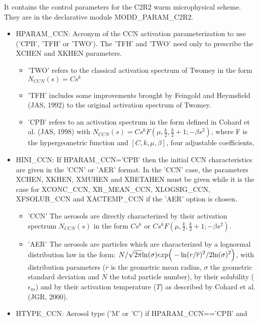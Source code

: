 It contains the control parameters for the C2R2 warm microphysical
scheme. They are in the declarative module MODD\_PARAM\_C2R2.
\begin{itemize}
\item HPARAM\_CCN: Acronym of the CCN activation parameterization to use ('CPB',
'TFH' or 'TWO'). The 'TFH' and 'TWO' need only to prescribe the XCHEN and XKHEN
 parameters.
\begin{itemize}
\item 'TWO' refers to the classical activation spectrum of Twomey
in the form $N_{CCN}(s)= C s^k$
\item 'TFH' includes some improvements brought by Feingold and Heymsfield
(JAS, 1992) to the original activation spectrum of Twomey.
\item 'CPB' refers to an activation spectrum in the form defined in Cohard et 
al. (JAS, 1998) with 
$N_{CCN}(s)= C s^k F(\mu,\frac{\displaystyle{k}}{\displaystyle{2}},
                  \frac{\displaystyle{k}}{\displaystyle{2}}+1;-\beta s^2)$,
where F is the hypergeometric function and $[C, k, \mu, \beta]$, four adjustable
 coefficients,
\end{itemize}
\item HINI\_CCN: If HPARAM\_CCN='CPB' then the initial CCN characteristics are
given in the 'CCN' or 'AER' format. In the 'CCN' case, the parameters XCHEN,
XKHEN, XMUHEN and XBETAHEN must be given while it is the case for XCONC\_CCN,
XR\_MEAN\_CCN, XLOGSIG\_CCN, XFSOLUB\_CCN and XACTEMP\_CCN if the 'AER' option is 
chosen. 
\begin{itemize}
\item 'CCN' The aerosols are directly characterized by their activation spectrum $N_{CCN}(s)$ in the form $C s^k$ or $C s^k F(\mu,\frac{\displaystyle{k}}{\displaystyle{2}},
                  \frac{\displaystyle{k}}{\displaystyle{2}}+1;-\beta s^2)$.
\item 'AER' The aerosols are particles which are characterized by a lognormal 
distribution law in the form: 
${\displaystyle N}/{\displaystyle {\sqrt {2 \pi}} {\rm ln}(\sigma)}
      exp \Big ( - {\displaystyle {\rm ln} (r/\overline{r})^2}/
                   {\displaystyle 2 {\rm ln}(\sigma)^2} \Big )$, with
distribution parameters ($\overline{r}$ is the geometric mean radius, $\sigma$
the geometric standard deviation and $N$ the total particle number), by their
solubility ($\epsilon_m$) and by their activation temperature ($T$) as 
described by Cohard et al. (JGR, 2000).
\end{itemize}
\item HTYPE\_CCN: Aerosol type ('M' or 'C') if HPARAM\_CCN=='CPB' and 

\end{itemize}
